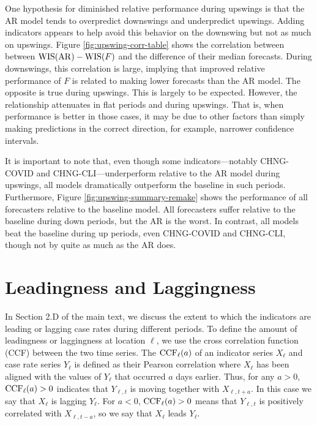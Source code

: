 One hypothesis for diminished relative performance during upswings is that the
AR model tends to overpredict downswings and underpredict upswings.  Adding
indicators appears to help avoid this behavior on the downswing but not as much
on upswings.  Figure \ref{fig:upswing-corr-table} shows the correlation between
between $\mathrm{WIS}(\mathrm{AR}) - \mathrm{WIS}(F)$ and the difference of their median
forecasts.  During downswings, this correlation is large, implying that improved
relative performance of $F$ is related to making lower forecasts than the AR
model.  The opposite is true during upswings.  This is largely to be expected.
However, the relationship attenuates in flat periods and during upswings. That
is, when performance is better in those cases, it may be due to other factors
than simply making predictions in the correct direction, for example, narrower
confidence intervals.

It is important to note that, even though some indicators---notably CHNG-COVID
and CHNG-CLI---underperform relative to the AR model during upswings, all models
dramatically outperform the baseline in such periods.  Furthermore, Figure
\ref{fig:upswing-summary-remake} shows the performance of all forecasters
relative to the baseline model.  All forecasters suffer relative to the baseline
during down periods, but the AR is the worst. In contrast, all models beat the
baseline during up periods, even CHNG-COVID and CHNG-CLI, though not by quite as
much as the AR does.

\section{Leadingness and Laggingness}

In Section 2.D of the main text, we discuss the extent to which the indicators
are leading or lagging case rates during different periods. To define the amount
of leadingness or laggingness at location $\ell$, we use the cross correlation
function (CCF) between the two time series. The $\mathrm{CCF}_\ell(a)$ of an indicator
series $X_{\ell}$ and case rate series $Y_{\ell}$ is defined as their Pearson 
correlation where $X_\ell$ has been aligned with the values of $Y_{\ell}$ that
occurred $a$ days earlier.  Thus, for any $a>0$, $\mathrm{CCF}_{\ell}(a)>0$ indicates
that $Y_{\ell,t}$ is moving together with $X_{\ell,t+a}$.  In this case we say
that $X_{\ell}$ is lagging $Y_{\ell}$. For $a<0$, $\mathrm{CCF}_{\ell}(a)>0$ means that
$Y_{\ell,t}$ is positively correlated with $X_{\ell,t-a}$, so we say that
$X_{\ell}$ leads $Y_{\ell}$.

